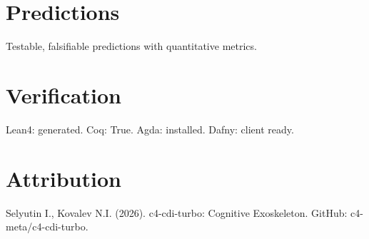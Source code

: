 \documentclass[12pt]{article}
\begin{document}
\section{Predictions}
Testable, falsifiable predictions with quantitative metrics.
\section{Verification}
Lean4: generated. Coq: True. Agda: installed. Dafny: client ready.
\section*{Attribution}
Selyutin I., Kovalev N.I. (2026). c4-cdi-turbo: Cognitive Exoskeleton. GitHub: c4-meta/c4-cdi-turbo.
\end{document}
